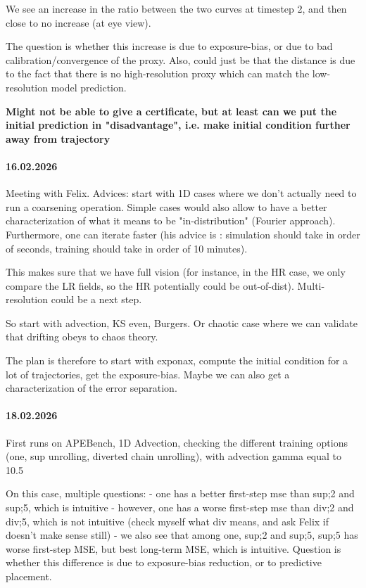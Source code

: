 \documentclass{article}
\begin{document}
We see an increase in the ratio between the two curves at timestep 2, and then close to no increase (at eye view).

The question is whether this increase is due to exposure-bias, or due to bad calibration/convergence of the proxy. Also, could just be that the distance is due to the fact that there is no high-resolution proxy which can match the low-resolution model prediction.

\textbf{Might not be able to give a certificate, but at least can we put the initial prediction in "disadvantage", i.e. make initial condition further away from trajectory}

\paragraph{16.02.2026}

Meeting with Felix. Advices: start with 1D cases where we don't actually need to run a coarsening operation.  Simple cases would also allow to have a better characterization of what it means to be "in-distribution" (Fourier approach). Furthermore, one can iterate faster (his advice is : simulation should take in order of seconds, training should take in order of 10 minutes).

This makes sure that we have full vision (for instance, in the HR case, we only compare the LR fields, so the HR potentially could be out-of-dist). Multi-resolution could be a next step.

So start with advection, KS even, Burgers. Or chaotic case where we can validate that drifting obeys to chaos theory. 

The plan is therefore to start with exponax, compute the initial condition for a lot of trajectories, get the exposure-bias. Maybe we can also get a characterization of the error separation.

\paragraph{18.02.2026}
First runs on APEBench, 1D Advection, checking the different training options (one, sup unrolling, diverted chain unrolling), with advection gamma equal to 10.5

On this case, multiple questions:
- one has a better first-step mse than sup;2 and sup;5, which is intuitive
- however, one has a worse first-step mse than div;2 and div;5, which is not intuitive (check myself what div means, and ask Felix if doesn't make sense still)
- we also see that among one, sup;2 and sup;5, sup;5 has worse first-step MSE, but best long-term MSE, which is intuitive. Question is whether this difference is due to exposure-bias reduction, or to predictive placement.
\end{document}
